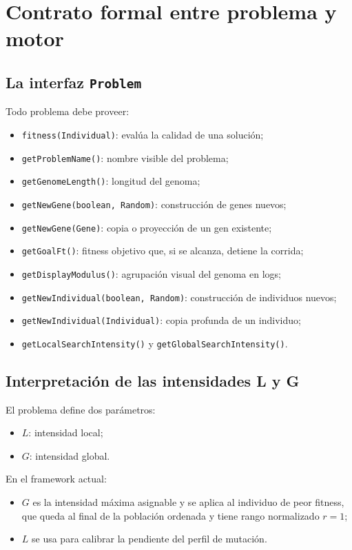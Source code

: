 \documentclass[11pt]{article}
\begin{document}
\section{Contrato formal entre problema y motor}

\subsection{La interfaz \texttt{Problem}}

Todo problema debe proveer:

\begin{itemize}
  \item \texttt{fitness(Individual)}: eval\'ua la calidad de una soluci\'on;
  \item \texttt{getProblemName()}: nombre visible del problema;
  \item \texttt{getGenomeLength()}: longitud del genoma;
  \item \texttt{getNewGene(boolean, Random)}: construcci\'on de genes nuevos;
  \item \texttt{getNewGene(Gene)}: copia o proyecci\'on de un gen existente;
  \item \texttt{getGoalFt()}: fitness objetivo que, si se alcanza, detiene la
  corrida;
  \item \texttt{getDisplayModulus()}: agrupaci\'on visual del genoma en logs;
  \item \texttt{getNewIndividual(boolean, Random)}: construcci\'on de
  individuos nuevos;
  \item \texttt{getNewIndividual(Individual)}: copia profunda de un individuo;
  \item \texttt{getLocalSearchIntensity()} y
  \texttt{getGlobalSearchIntensity()}.
\end{itemize}

\subsection{Interpretaci\'on de las intensidades L y G}

El problema define dos par\'ametros:

\begin{itemize}
  \item \(L\): intensidad local;
  \item \(G\): intensidad global.
\end{itemize}

En el framework actual:

\begin{itemize}
  \item \(G\) es la intensidad m\'axima asignable y se aplica al individuo de
  peor fitness, que queda al final de la poblaci\'on ordenada y tiene rango
  normalizado \(r=1\);
  \item \(L\) se usa para calibrar la pendiente del perfil de mutaci\'on.
\end{itemize}
\end{document}
